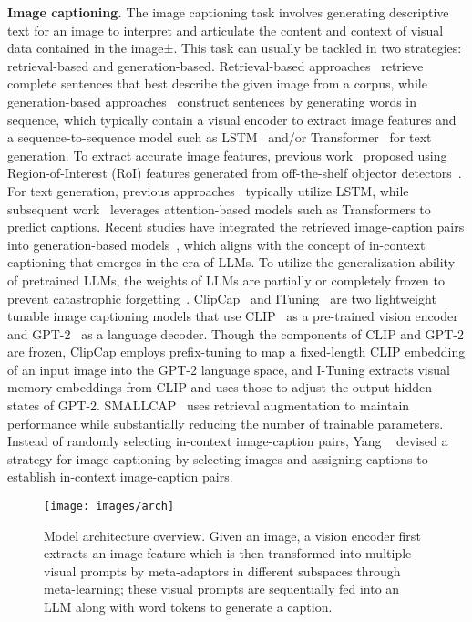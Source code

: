 \noindent \textbf{Image captioning.} 
The image captioning task involves generating descriptive text for an image to interpret and articulate the content and context of visual data contained in the image±\cite{vinyals2015show,xu2015show}. This task can usually be tackled in two strategies: retrieval-based and generation-based. Retrieval-based approaches~\cite{zhao2020cross,al2022image} retrieve complete sentences that best describe the given image from a corpus, while generation-based approaches~\cite{vinyals2015show,xu2015show} construct sentences by generating words in sequence, which typically contain a visual encoder to extract image features and a sequence-to-sequence model such as LSTM~\cite{hochreiter1997long} and/or Transformer~\cite{vaswani2017attention} for text generation. To extract accurate image features, previous work~\cite{you2016image,yang2022human,wang2019hierarchical} proposed using Region-of-Interest (RoI) features generated from off-the-shelf objector detectors~\cite{girshick2015fast}. For text generation, previous approaches~\cite{anderson2016spice,yao2019hierarchy,pan2020x} typically utilize LSTM, while subsequent work~\cite{li2020oscar,wang2022end,zeng2022s2} leverages attention-based models such as Transformers to predict captions. Recent studies have integrated the retrieved image-caption pairs into generation-based models~\cite{sarto2022retrieval,ramos2023smallcap}, which aligns with the concept of in-context captioning that emerges in the era of LLMs. To utilize the generalization ability of pretrained LLMs, the weights of LLMs are partially or completely frozen to prevent catastrophic forgetting~\cite{zhai2024investigating}. ClipCap~\cite{mokady2021clipcap} and ITuning~\cite{luo2022tuning} are two lightweight tunable image captioning models that use CLIP~\cite{song2022clip} as a pre-trained vision encoder and GPT-2~\cite{radford2019language} as a language decoder. Though the components of CLIP and GPT-2 are frozen, ClipCap employs prefix-tuning to map a fixed-length CLIP embedding of an input image into the GPT-2 language space, and I-Tuning extracts visual memory embeddings from CLIP and uses those to adjust the output hidden states of GPT-2. SMALLCAP~\cite{ramos2023smallcap} uses retrieval augmentation to maintain performance while substantially reducing the number of trainable parameters. Instead of randomly selecting in-context image-caption pairs, Yang \etal~\cite{yang2024exploring} devised a strategy for image captioning by selecting images and assigning captions to establish in-context image-caption pairs.

%
\begin{figure*}[!htb]
    \centering
    \texttt{[image: images/arch]}
    \caption{Model architecture overview. Given an image, a vision encoder first extracts an image feature which is then transformed into multiple visual prompts by meta-adaptors in different subspaces through meta-learning; these visual prompts
are sequentially fed into an LLM along with word tokens to generate a caption.}
    \label{fig:arch}
\end{figure*}
%